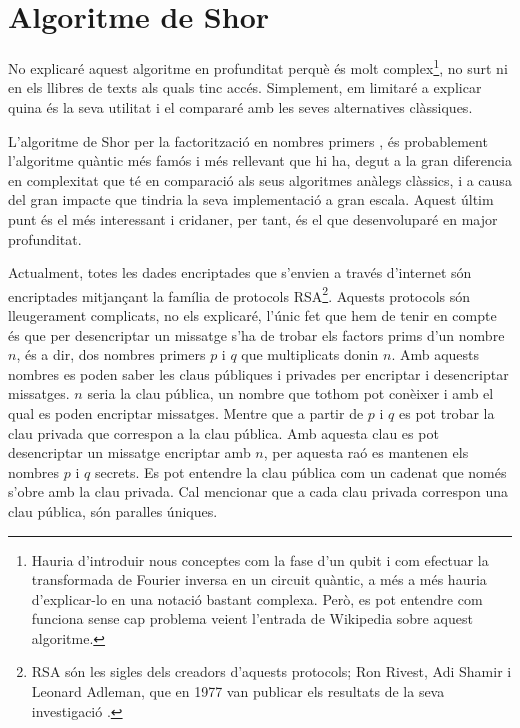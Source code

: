 \section{Algoritme de Shor}
No explicaré aquest algoritme en profunditat perquè és molt complex\footnote{Hauria d'introduir nous conceptes com la fase d'un qubit i com efectuar la transformada de Fourier inversa en un circuit quàntic, a més a més hauria d'explicar-lo en una notació bastant complexa. Però, es pot entendre com funciona sense cap problema veient l'entrada de Wikipedia sobre aquest algoritme.}, no surt ni en els llibres de texts als quals tinc accés. Simplement, em limitaré a explicar quina és la seva utilitat i el compararé amb les seves alternatives clàssiques.

L'algoritme de Shor per la factorització en nombres primers \cite{Shor_97}, és probablement l'algoritme quàntic més famós i més rellevant que hi ha, degut a la gran diferencia en complexitat que té en comparació als seus algoritmes anàlegs clàssics, i a causa del gran impacte que tindria la seva implementació a gran escala. Aquest últim punt és el més interessant i cridaner, per tant, és el que desenvoluparé en major profunditat.

Actualment, totes les dades encriptades que s'envien a través d'internet són encriptades mitjançant la família de protocols RSA\footnote{RSA són les sigles dels creadors d'aquests protocols; Ron Rivest, Adi Shamir i Leonard Adleman, que en 1977 van publicar els resultats de la seva investigació \cite{RSA}.}. Aquests protocols són lleugerament complicats, no els explicaré, l'únic fet que hem de tenir en compte és que per desencriptar un missatge s'ha de trobar els factors prims d'un nombre $n$, és a dir, dos nombres primers $p$ i $q$ que multiplicats donin $n$. Amb aquests nombres es poden saber les claus públiques i privades per encriptar i desencriptar missatges. $n$ seria la clau pública, un nombre que tothom pot conèixer i amb el qual es poden encriptar missatges. Mentre que a partir de $p$ i $q$ es pot trobar la clau privada que correspon a la clau pública. Amb aquesta clau es pot desencriptar un missatge encriptar amb $n$, per aquesta raó es mantenen els nombres $p$ i $q$ secrets. Es pot entendre la clau pública com un cadenat que només s'obre amb la clau privada. Cal mencionar que a cada clau privada correspon una clau pública, són paralles úniques.

